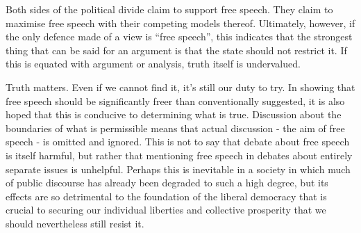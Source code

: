 Both sides of the political divide claim to support free speech. They
claim to maximise free speech with their competing models thereof.
Ultimately, however, if the only defence made of a view is ``free
speech'', this indicates that the strongest thing that can be said for
an argument is that the state should not restrict it. If this is equated
with argument or analysis, truth itself is undervalued.

Truth matters. Even if we cannot find it, it's still our duty to try. In
showing that free speech should be significantly freer than
conventionally suggested, it is also hoped that this is conducive to
determining what is true. Discussion about the boundaries of what is
permissible means that actual discussion - the aim of free speech - is
omitted and ignored. This is not to say that debate about free speech is
itself harmful, but rather that mentioning free speech in debates about
entirely separate issues is unhelpful. Perhaps this is inevitable in a
society in which much of public discourse has already been degraded to
such a high degree, but its effects are so detrimental to the foundation
of the liberal democracy that is crucial to securing our individual
liberties and collective prosperity that we should nevertheless still
resist it.
